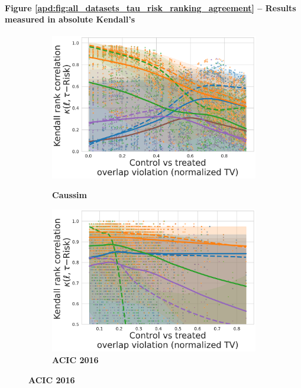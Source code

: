 \documentclass[french,12pt,twoside,a4paper]{book}
\begin{document}
\begin{appendices}
  \paragraph{Figure \ref{apd:fig:all_datasets_tau_risk_ranking_agreement} --
    Results measured in absolute Kendall's}


  \begin{figure}
    \centering
    \begin{subfigure}[b]{0.44\textwidth}
      \centering
      \caption{\textbf{Caussim}}
      \includegraphics[width=\textwidth]{img/chapter_5/kendalls_tau_caussim__nuisance_non_linear__candidates_ridge__overlap_01-247.pdf}
      \label{fig:ranking_agreement_w_tau_risk_caussim}
    \end{subfigure}
    \hfill
    \begin{subfigure}[b]{0.44\textwidth}
      \centering
      \caption{\textbf{ACIC 2016}}
      \includegraphics[width=\textwidth]{img/chapter_5/kendalls_tau_acic_2016__nuisance_non_linear__candidates_hist_gradient_boosting__dgp_1-77__rs_1-10.pdf}

\end{subfigure}
\end{figure}
\end{appendices}
\end{document}
